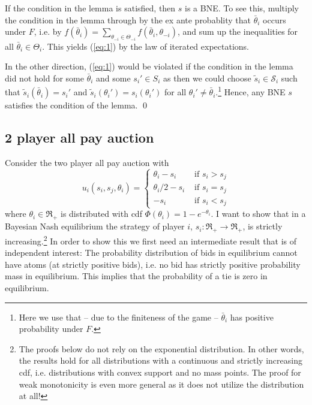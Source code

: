 \documentclass[a4paper,11pt]{article}
\begin{document}
If the condition in the lemma is satisfied, then $s$ is a BNE. To see this, multiply the condition in the lemma through by the ex ante probablity that $\bar \theta _i$ occurs under $F$, i.e. by $f(\bar\theta _i)=\sum_{\theta_{-i}\in\Theta _{-i}}f(\bar{\theta }_i,\theta _{-i})$, and sum up the inequalities for all $\bar{\theta }_i\in\Theta _i$. This yields (\ref{eq:1}) by the law of iterated expectations.

In the other direction, (\ref{eq:1}) would be violated if the condition in the lemma did not hold for some $\bar{\theta }_i$ and some  $s_i'\in S_i$ as then we could choose $\tilde{s}_i\in\mathcal{S}_i$ such that $\tilde{s}_i(\bar{\theta }_i)=s_i'$ and $\tilde{s}_i({\theta }_i')=s_i(\theta_i')$ for all $\theta _i'\neq\bar \theta _i$.\footnote{Here we use that -- due to the finiteness of the game -- $\bar{\theta }_i$ has positive probability under $F$.} Hence, any BNE $s$ satisfies the condition of the lemma.
 \qed

\subsection{2 player all pay auction}
\label{sec:2-player-all-pay}

Consider the two player all pay auction with
\begin{equation*}
  u_i(s_i,s_j,\theta _i)=
  \begin{cases}
    \theta _i-s_i & \text{ if }s_i>s_j\\
    \theta _i/2-s_i & \text{ if }s_i=s_j\\
    -s_i &\text{ if }s_i<s_j
  \end{cases}
\end{equation*}
where $\theta _i\in \Re_+$ is distributed with cdf $\Phi(\theta _i)=1-e^{-\theta _i}$. I want to show that in a Bayesian Nash equilibrium the strategy of player $i$, $s_i:\Re_+\rightarrow\Re_+$, is strictly increasing.\footnote{The proofs below do not rely on the exponential distribution. In other words, the results hold for all distributions with a continuous and strictly increasing cdf, i.e. distributions with convex support and no mass points. The proof for weak monotonicity is even more general as it does not utilize the distribution at all!} 
In order to show this we first need an intermediate result that is of independent interest: The probability distribution of bids in equilibrium cannot have atoms (at strictly positive bids), i.e. no bid has strictly positive probability mass in equilibrium. This implies that the probability of a tie is zero in equilibrium.
\end{document}
